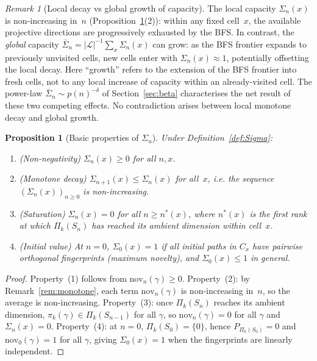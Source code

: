 \documentclass[11pt,a4paper]{article}
\newtheorem{proposition}[theorem]{Proposition}
\theoremstyle{definition}
\theoremstyle{remark}
\newtheorem{remark}[theorem]{Remark}
\newcommand{\Pik}{\Pi_k}
\newcommand{\nov}{\mathrm{nov}}
\begin{document}
    \begin{remark}[Local decay vs global growth of capacity]
      \label{rem:local-global}
      The local capacity $\Sigma_n(x)$ is non-increasing in~$n$
      (Proposition~\ref{prop:sigma-props}(2)): within any fixed cell~$x$, the available
      projective directions are progressively exhausted by the BFS.
      In contrast, the \emph{global} capacity $\bar\Sigma_n = |\mathcal{L}|^{-1}\sum_x \Sigma_n(x)$
      can grow: as the BFS frontier expands to previously unvisited cells, new cells enter with
      $\Sigma_n(x) \approx 1$, potentially offsetting the local decay.
      Here ``growth'' refers to the extension of the BFS frontier into fresh cells,
      not to any local increase of capacity within an already-visited cell.
      The power-law $\bar\Sigma_n \sim p(n)^{-\delta}$ of Section~\ref{sec:beta} characterises
      the net result of these two competing effects.
      No contradiction arises between local monotone decay and global growth.
    \end{remark}

    \begin{proposition}[Basic properties of $\Sigma_n$]
      \label{prop:sigma-props}
      Under Definition~\ref{def:Sigma}:
      \begin{enumerate}
        \item \textup{(Non-negativity)} $\Sigma_n(x) \geq 0$ for all $n,x$.
        \item \textup{(Monotone decay)} $\Sigma_{n+1}(x) \leq \Sigma_n(x)$ for all~$x$,
        i.e. the sequence $(\Sigma_n(x))_{n \geq 0}$ is non-increasing.
        \item \textup{(Saturation)} $\Sigma_n(x) = 0$ for all $n \geq n^*(x)$,
        where $n^*(x)$ is the first rank at which $\Pik(S_n)$ has reached its ambient dimension
        within cell~$x$.
        \item \textup{(Initial value)} At $n = 0$, $\Sigma_0(x) = 1$ if all initial paths in $C_x$
        have pairwise orthogonal fingerprints (maximum novelty), and $\Sigma_0(x) \leq 1$ in general.
      \end{enumerate}
    \end{proposition}

    \begin{proof}
      Property~(1) follows from $\nov_n(\gamma) \geq 0$.
      Property~(2): by Remark~\ref{rem:monotone}, each term $\nov_n(\gamma)$ is non-increasing
      in~$n$, so the average is non-increasing.
      Property~(3): once $\Pik(S_n)$ reaches its ambient dimension, $\pi_k(\gamma) \in \Pik(S_{n-1})$
      for all $\gamma$, so $\nov_n(\gamma) = 0$ for all $\gamma$ and $\Sigma_n(x) = 0$.
      Property~(4): at $n=0$, $\Pik(S_0) = \{0\}$, hence $P_{\Pik(S_0)} = 0$ and $\nov_0(\gamma) = 1$
      for all $\gamma$, giving $\Sigma_0(x) = 1$ when the fingerprints are linearly independent.
    \end{proof}
\end{document}
